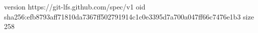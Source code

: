 version https://git-lfs.github.com/spec/v1
oid sha256:efb8793aff71810da7367ff502791914c1c0e3395d7a700a047ff66c7476e1b3
size 258
